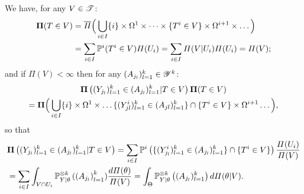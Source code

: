 We have,
for any $V\in\mathscr{T}$:
    \begin{align}
          \mathbf{\Pi}(T\in V) &= \overline{\varPi}\Big(\bigcup_{i\in I}\{i\}\times\Omega^1\times\dots\times\{T^i\in V\}\times\Omega^{i+1}\times\dots\Big)\\
          &=\sum_{i\in I}\mathbb{P}^i(T^i\in V)\varPi(U_i) = \sum_{i\in I}\varPi(V|U_i)\varPi(U_i) = \varPi(V);\nonumber
    \end{align}
and if $\varPi(V)<\infty$ then for any $(A_{j_l})_{l=1}^k\in\mathscr{Y}^k$: %
    \begin{multline}
        \mathbf{\Pi}\left((Y_{j_l})_{l=1}^k\in(A_{j_l})_{l=1}^k|T\in V\right)\mathbf{\Pi}(T\in V) \\ = 
        \mathbf{\Pi}\Big(\bigcup_{i\in I}  \{i\}\times\Omega^1\times\dots\{(Y^i_{jl})_{l=1}^k\in(A_{jl})_{l=1}^k\}\cap \{T^i\in V \}\times\Omega^{i+1}\dots 
        \Big),
    \end{multline}
    so that
        \begin{align}\nonumber
        &\mathbf{\Pi}\left((Y_{j_l})_{l=1}^k\in(A_{j_l})_{l=1}^k|T\in V\right) 
            = \sum_{i\in I}\mathbb{P}^i\left( \{(Y_{j_l}^i)_{l=1}^k\in(A_{j_l})_{l=1}^k\}\cap \{T^i\in V\}\right)\frac{\varPi(U_i)}{\varPi(V)} \\
            &= \sum_{i\in I}\int_{V\cap U_i}\mathbb{P}^{\otimes k}_{Y|\theta}\left((A_{j_l}\right)_{l=1}^k)\frac{d\varPi(\theta)}{\varPi(V)}  = \int_\Theta\mathbb{P}^{\otimes k}_{Y|\theta}\left((A_{j_l})_{l=1}^k\right)d\varPi(\theta|V).
    \end{align}



